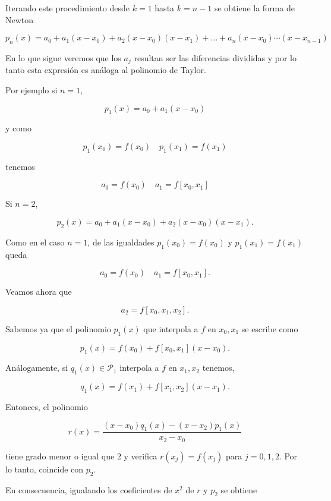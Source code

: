\documentclass[10pt]{book}
\begin{document}
Iterando este procedimiento desde $k=1$ hasta $k=n-1$ se obtiene la forma de Newton

$$
p_{n}(x)=a_{0}+a_{1}\left(x-x_{0}\right)+a_{2}\left(x-x_{0}\right)\left(x-x_{1}\right)+\ldots+a_{n}\left(x-x_{0}\right) \cdots\left(x-x_{n-1}\right)
$$

En lo que sigue veremos que los $a_{j}$ resultan ser las diferencias divididas y por lo tanto esta expresión es análoga al polinomio de Taylor.

Por ejemplo si $n=1$,

$$
p_{1}(x)=a_{0}+a_{1}\left(x-x_{0}\right)
$$

y como

$$
p_{1}\left(x_{0}\right)=f\left(x_{0}\right) \quad p_{1}\left(x_{1}\right)=f\left(x_{1}\right)
$$

tenemos

$$
a_{0}=f\left(x_{0}\right) \quad a_{1}=f\left[x_{0}, x_{1}\right]
$$

Si $n=2$,

$$
p_{2}(x)=a_{0}+a_{1}\left(x-x_{0}\right)+a_{2}\left(x-x_{0}\right)\left(x-x_{1}\right) .
$$

Como en el caso $n=1$, de las igualdades $p_{1}\left(x_{0}\right)=f\left(x_{0}\right)$ y $p_{1}\left(x_{1}\right)=f\left(x_{1}\right)$ queda

$$
a_{0}=f\left(x_{0}\right) \quad a_{1}=f\left[x_{0}, x_{1}\right] .
$$

Veamos ahora que

$$
a_{2}=f\left[x_{0}, x_{1}, x_{2}\right] .
$$

Sabemos ya que el polinomio $p_{1}(x)$ que interpola a $f$ en $x_{0}, x_{1}$ se escribe como

$$
p_{1}(x)=f\left(x_{0}\right)+f\left[x_{0}, x_{1}\right]\left(x-x_{0}\right) .
$$

Análogamente, si $q_{1}(x) \in \mathcal{P}_{1}$ interpola a $f$ en $x_{1}, x_{2}$ tenemos,

$$
q_{1}(x)=f\left(x_{1}\right)+f\left[x_{1}, x_{2}\right]\left(x-x_{1}\right) .
$$

Entonces, el polinomio

$$
r(x)=\frac{\left(x-x_{0}\right) q_{1}(x)-\left(x-x_{2}\right) p_{1}(x)}{x_{2}-x_{0}}
$$

tiene grado menor o igual que 2 y verifica $r\left(x_{j}\right)=f\left(x_{j}\right)$ para $j=0,1,2$. Por lo tanto, coincide con $p_{2}$.

En consecuencia, igualando los coeficientes de $x^{2}$ de $r$ y $p_{2}$ se obtiene
\end{document}
